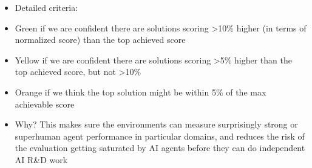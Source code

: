 \documentclass[
]{article}
\providecommand{\tightlist}{%
  \setlength{\itemsep}{0pt}\setlength{\parskip}{0pt}}
\begin{document}
\begin{itemize}
\tightlist
\item
  {Detailed criteria:}
\end{itemize}

\begin{itemize}
\tightlist
\item
  {Green }{if we are confident there are solutions scoring
  \textgreater10\% higher (in terms of normalized score) than the top
  achieved score}
\item
  {Yellow }{if we are confident there are solutions scoring
  \textgreater5\% higher than the top achieved score, but not
  \textgreater10\%}
\item
  {Orange }{if we think the top solution might be within 5\% of the max
  achievable score}
\end{itemize}

\begin{itemize}
\tightlist
\item
  {Why? This makes sure the environments can measure surprisingly strong
  or superhuman agent performance in particular domains, and reduces the
  risk of the evaluation getting saturated by AI agents before they can
  do independent AI R\&D work}
\end{itemize}

{}

{}
\end{document}

